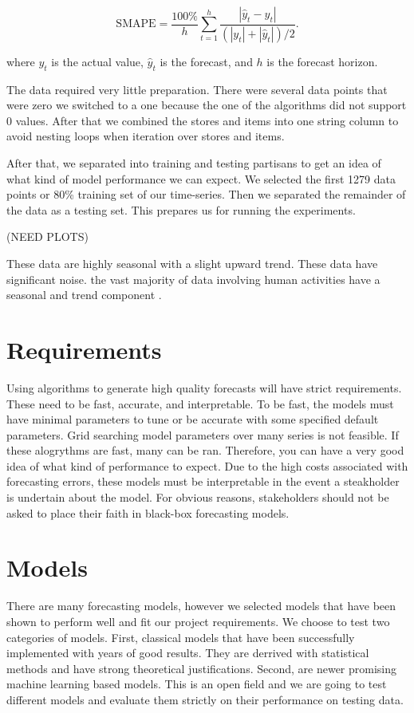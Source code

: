 \documentclass[16pt,twocolumn,letterpaper]{article}
\begin{document}
\begin{equation}
\textrm{SMAPE}={\frac {100\%}{h}}\sum _{t=1}^{h}{\frac {\left|\hat{y}_t-y_t\right|}{(|y_t|+|\hat{y}_t|)/2}}.
\end{equation}

where $y_t$ is the actual value, $\hat{y}_t$ is the forecast, and $h$ is the forecast horizon.

The data required very little preparation. There were several data points that were zero we switched to a one because the one of the algorithms did not support 0 values. After that we combined the stores and items into one string column to avoid nesting loops when iteration over stores and items.

After that, we separated into training and testing partisans to get an idea of what kind of model performance we can expect. We selected the first 1279 data points or 80\% training set of our time-series. Then we separated the remainder of the data as a testing set. This prepares us for running the experiments.

(NEED PLOTS)

These data are highly seasonal with a slight upward trend. These data have significant noise. the vast majority of data involving human activities have a seasonal and trend component \cite{taylor2018forecasting}. 

\section{Requirements}

Using algorithms to generate high quality forecasts will have strict requirements. These need to be fast, accurate, and interpretable. To be fast, the models must have minimal parameters to tune or be accurate with some specified default parameters. Grid searching model parameters over many series is not feasible. If these alogrythms are fast, many can be ran. Therefore, you can have a very good idea of what kind of performance to expect. Due to the high costs associated with forecasting errors, these models must be interpretable in the event a steakholder is undertain about the model. For obvious reasons, stakeholders should not be asked to place their faith in black-box forecasting models.

\section{Models}

There are many forecasting models, however we selected models that have been shown to perform well and fit our project requirements. We choose to test two categories of models. First, classical models that have been successfully implemented with years of good results. They are derrived with statistical methods and have strong theoretical justifications. Second, are newer promising machine learning based models. This is an open field and we are going to test different models and evaluate them strictly on their performance on testing data. 
\end{document}
